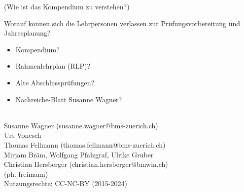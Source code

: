 {(Wie ist das Kompendium zu verstehen?)

Worauf können sich die Lehrpersonen verlassen zur Prüfungsvorbereitung
und Jahresplanung?
\begin{itemize}
\item Kompendium?
\item Rahmenlehrplan (RLP)?
\item Alte Abschlussprüfungen?
\item Nachreiche-Blatt Susanne Wagner?
\end{itemize}

\vspace{30mm}
\begin{center}\begin{small} \textbf{ }\\
Susanne Wagner (susanne.wagner@bms-zuerich.ch)\\
Urs Vonesch\\
Thomas Fellmann (thomas.fellmann@bms-zuerich.ch)\\
Mirjam Bräm, Wolfgang Pfalzgraf, Ulrike Gruber\\
Christian Hersberger (christian.hersberger@bmwin.ch)\\
(ph. freimann)\\
\vspace{2mm}
Nutzungsrechte: CC-NC-BY (2015-2024)

\end{small}%
\end{center}

\newpage


\tableofcontents{}
\newpage
\pagestyle{fancy}
}%
